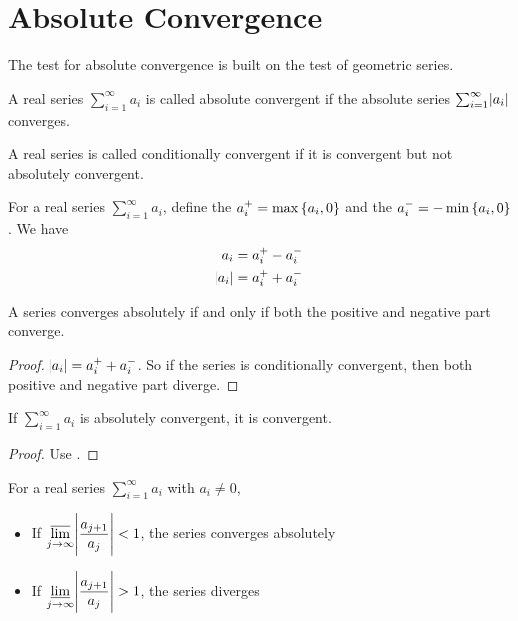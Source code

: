 
\section{Absolute Convergence}

The test for absolute convergence is built on the test of geometric series.

\begin{definition}
    A real series $\sum_{i=1}^\infty a_i$ is called absolute convergent if the absolute series $\sum_{i=1}^\infty \abs{a_i}$ converges.
\end{definition}

\begin{definition}
    A real series is called conditionally convergent if it is convergent but not absolutely convergent.
\end{definition}

\begin{theorem}\label{conditional_converge_requirement}
    For a real series $\sum_{i=1}^\infty a_i$, define the  $a^{+}_i = \max \set{a_i, 0}$ and the  $a_i^{-} = - \min \set{a_i, 0}$. We have
    \begin{equation}
        \begin{aligned}
            a_i &= a_i^{+} - a_i^{-} \\
            \abs{a_i} &= a_i^{+} + a_i^{-}
        \end{aligned}
    \end{equation}
    
    A series converges absolutely if and only if both the positive and negative part converge. 
\end{theorem}
\begin{proof}
    $\abs{a_i} = a_i^{+} + a_i^{-}$. So if the series is conditionally convergent, then both positive and negative part diverge.   
\end{proof}


\begin{theorem}
    If $\sum_{i=1}^\infty a_i$ is absolutely convergent, it is convergent.
\end{theorem}
\begin{proof}
    Use .
\end{proof}


\begin{theorem}
    For a real series $\sum_{i=1}^\infty a_i$ with $a_i \neq 0$,
    \begin{itemize}
        \item If $\displaystyle \varlimsup_{j \rightarrow \infty} \abs{\frac{a_{j+1}}{a_j}} < 1$, the series converges absolutely
        \item If $\displaystyle \varliminf_{j \rightarrow \infty} \abs{\frac{a_{j+1}}{a_j}} > 1$, the series diverges
    \end{itemize}
\end{theorem}

